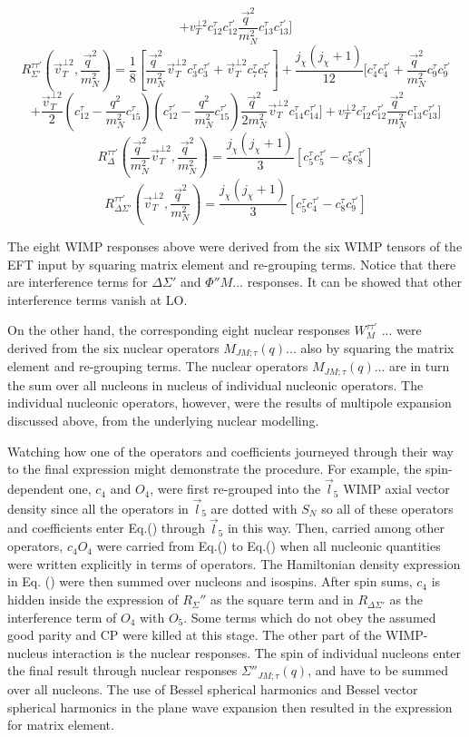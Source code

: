 \documentclass[12pt]{article}
\begin{document}
$$
+ v_T^{\bot2}c_{12}^\tau c_{12}^{\tau'}
\frac{\vec q^2}{m_N^2}c_{13}^\tau c_{13}^{\tau'}
]
$$
$$
R_{ \Sigma'} ^{\tau \tau'} ( \vec v_T^{\bot2}, \frac{\vec q^2}{m_N^2})
= \frac{1}{8}[ \frac{\vec q^2}{m_N^2} \vec v_T^{\bot2} c_{3}^\tau c_{3}^{\tau' } +\vec v_T^{\bot2} c_{7}^\tau c_{7}^{\tau' } ]
+ \frac{j_\chi (j_\chi +1)}{12} [
c_{4}^\tau c_{4}^{\tau'} + \frac{\vec q^2}{m_N^2}c_9^\tau c_{9}^{\tau'}
$$
$$
+\frac{\vec v_T^{\bot2}}{2} (c_{12}^\tau - \frac{q^2}{m_N^2} c_{15}^\tau) (c_{12}^{\tau'} - \frac{q^2 }{ m_N^2 } c_{15}^{\tau'})
\frac{\vec q^2}{2m_N^2 } \vec v_T^{\bot2} c_{14}^\tau c_{14}^{\tau'}]
+ v_T^{\bot2}c_{12}^\tau c_{12}^{\tau'}
\frac{\vec q^2}{m_N^2}c_{13}^\tau c_{13}^{\tau'}
]
$$
$$
R_{\Delta } ^{\tau \tau'} (\frac{\vec q^2}{m_N^2}  \vec v_T^{\bot2}, \frac{\vec q^2}{m_N^2})
=\frac{j_\chi (j_\chi+1)}{3} [c_5^\tau c_5^{\tau'} - c_8^\tau c_8^{\tau'} ]
$$
$$
R_{\Delta \Sigma'} ^{\tau \tau'} ( \vec v_T^{\bot2}, \frac{\vec q^2}{m_N^2})
=\frac{j_\chi (j_\chi+1)}{3} [c_5^\tau c_4^{\tau'} - c_8^\tau c_9^{\tau'} ]
$$

The eight WIMP responses above were derived from the six WIMP tensors of the EFT input by squaring matrix element and re-grouping terms. Notice that there are interference terms for $\Delta \Sigma'$ and $\Phi'' M...$ responses. It can be showed that other  interference terms vanish at LO.

On the other hand, the corresponding eight nuclear responses $W_M^{\tau\tau'}$ ...  were derived from the six nuclear operators $M_{JM;\tau}(q)...$ also by squaring the matrix element and re-grouping terms.  The nuclear operators  $M_{JM;\tau}(q)... $ are in turn the sum over all nucleons in nucleus of individual nucleonic operators. The individual nucleonic operators, however, were the results of multipole expansion discussed above, from the underlying nuclear modelling. 

Watching how one of the operators and coefficients journeyed through their way to the final expression might demonstrate the procedure. For example, the spin-dependent one, $c_4$ and $O_4$, were first re-grouped into the $\vec l_5$ WIMP axial vector density since all the operators in $\vec l_5$ are dotted with $S_N$ so all of these operators and coefficients enter Eq.() through  $\vec l_5$ in this way. Then, carried among other operators, $c_4O_4$ were carried from Eq.() to Eq.() when all nucleonic quantities were written explicitly in terms of operators.  The Hamiltonian density expression in Eq. () were then summed over nucleons and isospins. After spin sums, $c_4$ is hidden inside the expression of $R_\Sigma''$ as the square term and in $R_{\Delta\Sigma'}$ as the interference term of $O_4$ with $O_5$. Some terms which do not obey the assumed good parity and CP were killed at this stage. The other part of the WIMP-nucleus interaction is the nuclear responses. The spin of individual nucleons enter the final result through nuclear responses $\Sigma''_{JM;\tau}(q)$, and have to be summed over all nucleons. The use of Bessel spherical harmonics and Bessel vector spherical harmonics in the plane wave expansion then resulted in the expression for matrix element. 
\end{document}
